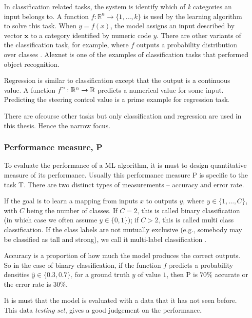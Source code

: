 In classification related tasks, the system is identify which of \textit{k} categories an
input belongs to. A function $f : \mathbb{R}^n \rightarrow\{1, \ldots,k\}$ is used by the
learning algorithm to solve this task. When $y = f(x)$, the model assigns an input
described by vector $\mathbf{x}$ to a category
identified by numeric code $y$. There are other variants of the classification
task, for example, where $f$ outputs a probability distribution over classes
\cite{Goodfellow-et-al-2016_1}. Alexnet \cite{Alexnet2012} is one of the examples of
classification tasks that performed object recognition.

Regression is similar to classification except that the output is a continuous value. A function $f
": \mathbb{R}^n \rightarrow \mathbb{R}$ predicts a numerical value for some input.
Predicting the steering control value is a prime example for regression task.

There are ofcourse other tasks but only classification and regression are used in this
thesis. Hence the narrow focus.

\subsubsection*{Performance measure, P}
To evaluate the performance of a ML algorithm, it is must to design quantitative measure
of its performance. Usually this performance measure P is specific to the task T. There
are two distinct types of measurements -- accuracy and error rate.

If the goal is to learn a mapping from inputs $x$ to outputs $y$, where $y \in \{1,\ldots
, C\}$, with $C$ being the number of classes. If $C = 2$, this is
called binary classification (in which case we often assume $y \in \{0, 1\})$; if $C > 2$, this is called
multi class classification. If the class labels are not mutually exclusive (e.g., somebody may be
classified as tall and strong), we call it multi-label classification
\cite{murphy2013machine_1}.

Accuracy is a proportion of how much the model produces the correct outputs.
So in the case of binary classification, if the function $f$ predicts a probability
densities $\hat y \in \{0.3, 0.7\}$, for a ground truth $y$ of value $1$, then P is $70\%$
accurate or the error rate is $30\%$.

It is must that the model is evaluated with a data that it has not seen before. This data
\textit{testing set}, gives a good judgement on the performance.

